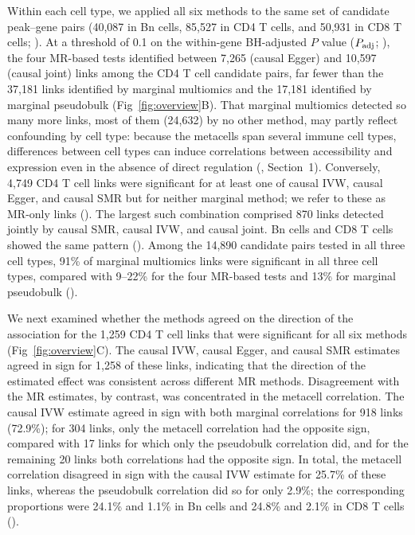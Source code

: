 Within each cell type, we applied all six methods to the same set of candidate peak--gene pairs (40,087 in Bn cells, 85,527 in CD4 T cells, and 50,931 in CD8 T cells; ). At a threshold of 0.1 on the within-gene BH-adjusted \(P\) value (\(P_{\mathrm{adj}}\); ), the four MR-based tests identified between 7,265 (causal Egger) and 10,597 (causal joint) links among the CD4 T cell candidate pairs, far fewer than the 37,181 links identified by marginal multiomics and the 17,181 identified by marginal pseudobulk (Fig~\ref{fig:overview}B). That marginal multiomics detected so many more links, most of them (24,632) by no other method, may partly reflect confounding by cell type: because the metacells span several immune cell types, differences between cell types can induce correlations between accessibility and expression even in the absence of direct regulation (, Section~1). Conversely, 4,749 CD4 T cell links were significant for at least one of causal IVW, causal Egger, and causal SMR but for neither marginal method; we refer to these as MR-only links (). The largest such combination comprised 870 links detected jointly by causal SMR, causal IVW, and causal joint. Bn cells and CD8 T cells showed the same pattern (). Among the 14,890 candidate pairs tested in all three cell types, 91\% of marginal multiomics links were significant in all three cell types, compared with 9--22\% for the four MR-based tests and 13\% for marginal pseudobulk ().

\noindent We next examined whether the methods agreed on the direction of the association for the 1,259 CD4 T cell links that were significant for all six methods (Fig~\ref{fig:overview}C). The causal IVW, causal Egger, and causal SMR estimates agreed in sign for 1,258 of these links, indicating that the direction of the estimated effect was consistent across different MR methods. Disagreement with the MR estimates, by contrast, was concentrated in the metacell correlation. The causal IVW estimate agreed in sign with both marginal correlations for 918 links (72.9\%); for 304 links, only the metacell correlation had the opposite sign, compared with 17 links for which only the pseudobulk correlation did, and for the remaining 20 links both correlations had the opposite sign. In total, the metacell correlation disagreed in sign with the causal IVW estimate for 25.7\% of these links, whereas the pseudobulk correlation did so for only 2.9\%; the corresponding proportions were 24.1\% and 1.1\% in Bn cells and 24.8\% and 2.1\% in CD8 T cells ().

